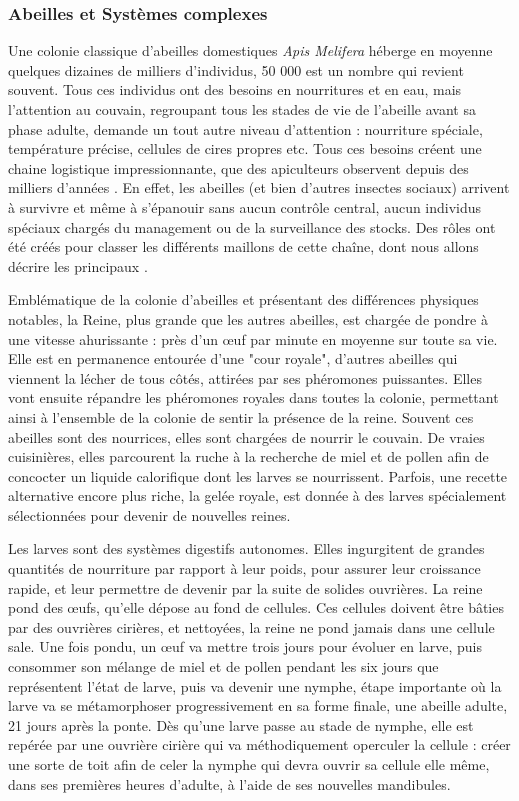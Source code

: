 			

	
		\subsubsection{Abeilles et Systèmes complexes}		
			Une colonie classique d'abeilles domestiques \textit{Apis Melifera} héberge en moyenne quelques dizaines de milliers d'individus, 50 000 est un nombre qui revient souvent. Tous ces individus ont des besoins en nourritures et en eau, mais l'attention au couvain, regroupant tous les stades de vie de l'abeille avant sa phase adulte, demande un tout autre niveau d'attention : nourriture spéciale, température précise, cellules de cires propres etc. Tous ces besoins créent une chaine logistique impressionnante, que des apiculteurs observent depuis des milliers d'années \cite{oldroyd_domestication_2012}. En effet, les abeilles (et bien d'autres insectes sociaux) arrivent à survivre et même à s'épanouir sans aucun contrôle central, aucun individus spéciaux chargés du management ou de la surveillance des stocks. Des rôles ont été créés pour classer les différents maillons de cette chaîne, dont nous allons décrire les principaux \cite{winston_biology_1991, winston_role_1991, seeley_age_1991}. 
			
			Emblématique de la colonie d'abeilles et présentant des différences physiques notables, la Reine, plus grande que les autres abeilles, est chargée de pondre à une vitesse ahurissante : près d'un œuf par minute en moyenne sur toute sa vie. Elle est en permanence entourée d'une "cour royale", d'autres abeilles qui viennent la lécher de tous côtés, attirées par ses phéromones puissantes. Elles vont ensuite répandre les phéromones royales dans toutes la colonie, permettant ainsi à l'ensemble de la colonie de sentir la présence de la reine. Souvent ces abeilles sont des nourrices, elles sont chargées de nourrir le couvain. De vraies cuisinières, elles parcourent la ruche à la recherche de miel et de pollen afin de concocter un liquide calorifique dont les larves se nourrissent. Parfois, une recette alternative encore plus riche, la gelée royale, est donnée à des larves spécialement sélectionnées pour devenir de nouvelles reines.
			
			Les larves sont des systèmes digestifs autonomes. Elles ingurgitent de grandes quantités de nourriture par rapport à leur poids, pour assurer leur croissance rapide, et leur permettre de devenir par la suite de solides ouvrières. La reine pond des œufs, qu'elle dépose au fond de cellules. Ces cellules doivent être bâties par des ouvrières cirières, et nettoyées, la reine ne pond jamais dans une cellule sale. Une fois pondu, un œuf va mettre trois jours pour évoluer en larve, puis consommer son mélange de miel et de pollen pendant les six jours que représentent l'état de larve, puis va devenir une nymphe, étape importante où la larve va se métamorphoser progressivement en sa forme finale, une abeille adulte, 21 jours après la ponte. Dès qu'une larve passe au stade de nymphe, elle est repérée par une ouvrière cirière qui va méthodiquement operculer la cellule : créer une sorte de toit afin de celer la nymphe qui devra ouvrir sa cellule elle même, dans ses premières heures d'adulte, à l'aide de ses nouvelles mandibules.
			
